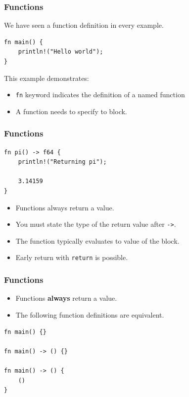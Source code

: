 \begin{frame}[fragile]
    \frametitle{Functions}
    We have seen a function definition in every example.
    \pause
    \vfill
    \begin{verbatim}
fn main() {
    println!("Hello world");
}
    \end{verbatim}
    \pause
    \vfill
    This example demonstrates:
    \begin{itemize}
        \item \texttt{fn} keyword indicates the definition of a named function
        \item A function needs to specify to block.
    \end{itemize}
\end{frame}

\begin{frame}[fragile]
    \frametitle{Functions}
    \begin{verbatim}
fn pi() -> f64 {
    println!("Returning pi");

    3.14159
}
    \end{verbatim}
    \pause
    \vfill
    \begin{itemize}
        \item Functions always return a value.
        \item You must state the type of the return value after \texttt{->}.
        \pause
        \vfill
        \item The function typically evaluates to value of the block.
        \item Early return with \texttt{return} is possible.
    \end{itemize}
\end{frame}

\begin{frame}[fragile]
    \frametitle{Functions}
    
    \begin{itemize}
        \item Functions \textbf{always} return a value.
        \item The following function definitions are equivalent.
    \end{itemize}
    \pause
    \vfill
    \begin{verbatim}
fn main() {}

fn main() -> () {}

fn main() -> () {
    ()
}
    \end{verbatim}
\end{frame}

